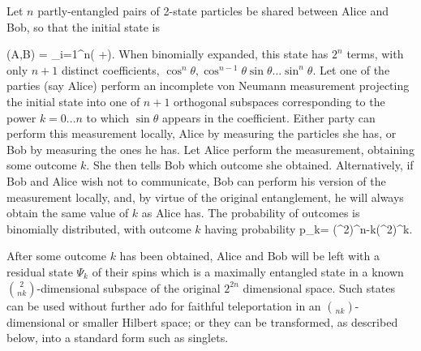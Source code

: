 Let $n$ partly-entangled pairs of 2-state particles be shared between Alice
and Bob, so that the initial state is
 
\beq
\Psi(A,B) = \prod_{i=1}^n(\cos\theta{}
                   +\sin\theta{}).
\eeq
When binomially expanded, this state has $2^n$ terms, with only
$n+1$ distinct coefficients, $\cos^n\theta, \cos^{n-1}\theta \sin
\theta...\sin^n\theta$.  Let one of the parties (say Alice)
perform an incomplete von Neumann measurement projecting the
initial state into one of $n+1$ orthogonal subspaces
corresponding to the power $k=0...n$ to which $\sin\theta$
appears in the coefficient.  Either party can perform this
measurement locally, Alice by measuring the particles she has,
or Bob by measuring the ones he has.  Let Alice perform
the measurement, obtaining some outcome $k$.  She then tells Bob
which outcome she obtained.  Alternatively, if Bob and Alice
wish not to communicate, Bob can perform his version of the
measurement locally, and, by virtue of the original
entanglement, he will always obtain the same value of $k$ as
Alice has.   The probability of outcomes is binomially
distributed, with outcome $k$ having probability
\beq
p_k= (\cos^2\theta)^{n-k}(\sin^2\theta)^k.
\eeq
 
After some outcome $k$ has been obtained, Alice and Bob will be left
with a residual state $\Psi_k$ of their spins which is a maximally
entangled state in a known $2\choose{n}{k}$-dimensional subspace of the
original $2^{2n}$ dimensional space.  Such states can be used without
further ado for faithful teleportation in an $\choose{n}{k}$-dimensional
or smaller Hilbert space; or they can be transformed, as described
below, into a standard form such as singlets.
 
